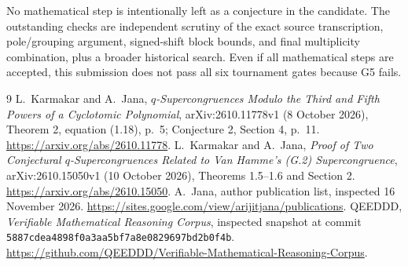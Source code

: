 \documentclass[11pt,a4paper]{article}
\begin{document}
No mathematical step is intentionally left as a conjecture in the
candidate. The outstanding checks are independent scrutiny of the exact
source transcription, pole/grouping argument, signed-shift block bounds,
and final multiplicity combination, plus a broader historical search.
Even if all mathematical steps are accepted, this submission does not
pass all six tournament gates because G5 fails.

\begin{thebibliography}{9}
 L.~Karmakar and A.~Jana,
\emph{$q$-Supercongruences Modulo the Third and Fifth Powers of a Cyclotomic Polynomial},
arXiv:2610.11778v1 (8 October 2026), Theorem 2, equation (1.18), p.~5;
Conjecture 2, Section 4, p.~11.
\url{https://arxiv.org/abs/2610.11778}.
 L.~Karmakar and A.~Jana,
\emph{Proof of Two Conjectural $q$-Supercongruences Related to Van Hamme's (G.2) Supercongruence},
arXiv:2610.15050v1 (10 October 2026), Theorems 1.5--1.6 and Section 2.
\url{https://arxiv.org/abs/2610.15050}.
 A.~Jana, author publication list, inspected 16 November 2026.
\url{https://sites.google.com/view/arijitjana/publications}.
 QEEDDD,
\emph{Verifiable Mathematical Reasoning Corpus}, inspected snapshot at
commit \texttt{5887cdea4898f0a3aa5bf7a8e0829697bd2b0f4b}.
\url{https://github.com/QEEDDD/Verifiable-Mathematical-Reasoning-Corpus}.
\end{thebibliography}
\end{document}
